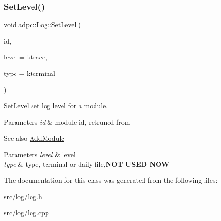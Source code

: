 \subsubsection{\texorpdfstring{Set\+Level()}{SetLevel()}}
{\footnotesize\ttfamily void adpc\+::\+Log\+::\+Set\+Level (\begin{DoxyParamCaption}\item[{const size\+\_\+t \&}]{id,  }\item[{const \hyperlink{log__config_8h_a172986fa5f658c5fe0b42bd954e9e133}{Log\+Level}}]{level = {\ttfamily ktrace},  }\item[{const Log\+Sink\+Type}]{type = {\ttfamily kterminal} }\end{DoxyParamCaption})\hspace{0.3cm}{\ttfamily [inline]}}



Set\+Level set log level for a module. 


\begin{DoxyParams}{Parameters}
{\em id} & module id, retruned from \\
\hline
\end{DoxyParams}
\begin{DoxySeeAlso}{See also}
\hyperlink{classadpc_1_1Log_a6b5cdb7e0f4a7cd5f29d031af4800ea7}{Add\+Module} 
\end{DoxySeeAlso}

\begin{DoxyParams}{Parameters}
{\em level} & level \\
\hline
{\em type} & type, terminal or daily file,{\bfseries N\+OT U\+S\+ED N\+OW} \\
\hline
\end{DoxyParams}


The documentation for this class was generated from the following files\+:\begin{DoxyCompactItemize}
\item 
src/log/\hyperlink{log_8h}{log.\+h}\item 
src/log/log.\+cpp\end{DoxyCompactItemize}
